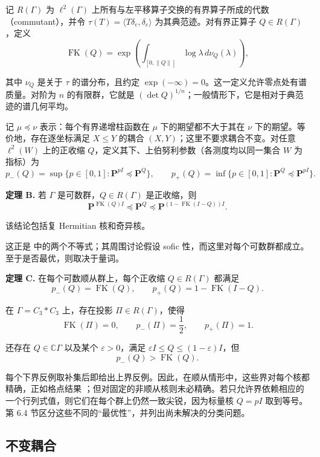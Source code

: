 \documentclass[UTF8,zihao=-4,a4paper]{ctexart}
\numberwithin{equation}{section}
\begin{document}
记 \(R(\Gamma)\) 为 \(\ell^2(\Gamma)\) 上所有与左平移算子交换的有界算子所成的代数（commutant），并令
\(\tau(T)=\langle T\delta_e,\delta_e\rangle\) 为其典范迹。对有界正算子 \(Q\in R(\Gamma)\)，定义
\[
 \operatorname{FK}(Q)
 =\exp\left(\int_{[0,\|Q\|]}\log\lambda\,d\nu_Q(\lambda)\right),
\]

其中 \(\nu_Q\) 是关于 \(\tau\) 的谱分布，且约定 \(\exp(-\infty)=0\)。这一定义允许零点处有谱质量。对阶为 \(n\) 的有限群，它就是 \((\det Q)^{1/n}\)；一般情形下，它是相对于典范迹的谱几何平均。

记 \(\mu\preceq\nu\) 表示：每个有界递增柱函数在 \(\mu\) 下的期望都不大于其在 \(\nu\) 下的期望。等价地，存在逐坐标满足 \(X\le Y\) 的耦合 \((X,Y)\)；这里不要求耦合不变。对任意 \(\ell^2(W)\) 上的正收缩 \(Q\)，定义其下、上伯努利参数（各测度均以同一集合 \(W\) 为指标）为
\[
 p_-(Q)=\sup\{p\in[0,1]:\mathbf P^{pI}\preceq\mathbf P^Q\},\qquad
 p_+(Q)=\inf\{p\in[0,1]:\mathbf P^Q\preceq\mathbf P^{pI}\}.
\]


\textbf{定理 B.} 若 \(\Gamma\) 是可数群，\(Q\in R(\Gamma)\) 是正收缩，则
\[
 \mathbf P^{\operatorname{FK}(Q)I}
 \preceq\mathbf P^Q
 \preceq\mathbf P^{(1-\operatorname{FK}(I-Q))I}.
 \tag{B}\label{eq:B}
\]

该结论包括复 Hermitian 核和奇异核。

这正是 \cite[Conjecture 5.7]{ICM} 中的两个不等式；其周围讨论假设 sofic 性，而这里对每个可数群都成立。至于是否最优，则取决于量词。

\textbf{定理 C.} 在每个可数顺从群上，每个正收缩 \(Q\in R(\Gamma)\) 都满足
\[
 p_-(Q)=\operatorname{FK}(Q),\qquad
 p_+(Q)=1-\operatorname{FK}(I-Q).
 \tag{C1}\label{eq:C1}
\]

在 \(\Gamma=C_3*C_3\) 上，存在投影 \(\Pi\in R(\Gamma)\)，使得
\[
 \operatorname{FK}(\Pi)=0,\qquad
 p_-(\Pi)=\frac12,\qquad p_+(\Pi)=1.
 \tag{C2}\label{eq:C2}
\]

还存在 \(Q\in\mathbb C\Gamma\) 以及某个 \(\varepsilon>0\)，满足
\(\varepsilon I\le Q\le(1-\varepsilon)I\)，但
\[
p_-(Q)>\operatorname{FK}(Q).
\]


每个下界反例取补集后即给出上界反例。因此，在顺从情形中，这些界对每个核都精确，正如格点结果 \cite[Theorem 5.11]{LS}；但对固定的非顺从核则未必精确。若只允许界依赖相应的一个行列式值，则它们在每个群上仍然一致尖锐，因为标量核 \(Q=pI\) 取到等号。第 6.4 节区分这些不同的“最优性”，并列出尚未解决的分类问题。

\subsection{不变耦合}
\end{document}
